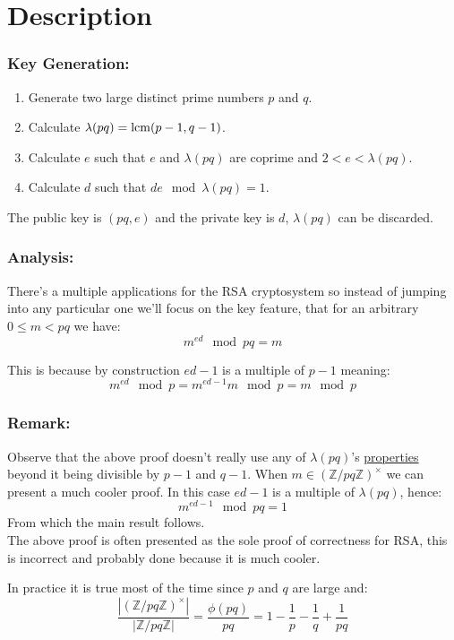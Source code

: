 
\section{Description}

\subsubsection{Key Generation:}
\begin{enumerate}
\item Generate two large distinct prime numbers $p$ and $q$.
\item Calculate $\lambda(pq) = \operatorname{lcm}(p-1,q-1)$.
\item Calculate $e$ such that $e$ and $\lambda(pq)$ are coprime and $2<e<\lambda(pq)$.
\item Calculate $d$ such that $de \mod \lambda(pq) = 1$.
\end{enumerate}
The public key is $(pq,e)$ and the private key is $d$,
$\lambda(pq)$ can be discarded.
\\

\subsubsection{Analysis:}
There's a multiple applications for the RSA cryptosystem so instead of jumping into any particular one we'll focus on the key feature,
that for an arbitrary $0\leq m < pq$ we have:
\[m^{ed}\mod pq = m\]

This is because by construction $ed-1$ is a multiple of $p-1$ meaning:
\[m^{ed}\mod p = m^{ed-1}m\mod p = m \mod p\]

\subsubsection{Remark:}
Observe that the above proof doesn't really use any of $\lambda(pq)$'s \hyperref[appx:torient]{properties} beyond it being divisible by $p-1$ and $q-1$.
When $m\in(\mathbb{Z}/pq\mathbb{Z})^\times$ we can present a much cooler proof.
In this case $ed-1$ is a multiple of $\lambda(pq)$, 
hence:
\[m^{ed-1} \mod pq = 1\]
From which the main result follows.
\\

The above proof is often presented as the sole proof of correctness for RSA,
this is incorrect and probably done because it is much cooler.

In practice it is true most of the time since $p$ and $q$ are large and:
\[\frac{|(\mathbb{Z}/pq\mathbb{Z})^\times|}{|\mathbb{Z}/pq\mathbb{Z}|} = \frac{\phi(pq)}{pq} = 1-\frac{1}{p}-\frac{1}{q} +\frac{1}{pq}\]

